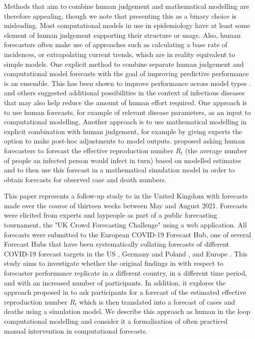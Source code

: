 \documentclass[10pt,a4paper,twocolumn]{article}
\begin{document}
Methods that aim to combine human judgement and mathematical modelling are therefore appealing, though we note that presenting this as a binary choice is misleading. Most computational models in use in epidemiology have at least some element of human judgement supporting their structure or usage. Also, human forecasters often make use of approaches such as calculating a base rate of incidences, or extrapolating current trends, which are in reality equivalent to simple models. One explicit method to combine separate human judgement and computational model forecasts with the goal of improving predictive performance is an ensemble. This has been shown to improve performance across model types \citep{mcandrewChimericForecastingCombining2022}. \citet{farrowHumanJudgmentApproach2017, bosseComparingHumanModelbased2022, swallowChallengesEstimationUncertainty2022} and others suggested additional possibilities in the context of infectious diseases that may also help reduce the amount of human effort required. One approach is to use human forecasts, for example of relevant disease parameters, as an input to computational modelling. Another approach is to use mathematical modelling in explicit combination with human judgement, for example by giving experts the option to make post-hoc adjustments to model outputs. \citet{bosseComparingHumanModelbased2022} proposed asking human forecasters to forecast the effective reproduction number $R_t$ (the average number of people an infected person would infect in turn) based on modelled estimates and to then use this forecast in a mathematical simulation model in order to obtain forecasts for observed case and death numbers. 

This paper represents a follow-up study to \citet{bosseComparingHumanModelbased2022} in the United Kingdom with forecasts made over the course of thirteen weeks between May and August 2021. Forecasts were elicited from experts and laypeople as part of a public forecasting tournament, the "UK Crowd Forecasting Challenge" using a web application. All forecasts were submitted to the European COVID-19 Forecast Hub, one of several Forecast Hubs that have been systematically collating forecasts of different COVID-19 forecast targets in the US \citep{cramerEvaluationIndividualEnsemble2021}, Germany and Poland \citep{bracherShorttermForecastingCOVID192021, bracherNationalSubnationalShortterm2022}, and Europe \citep{sherrattPredictivePerformanceMultimodel2022a}. This study aims to investigate whether the original findings in \citet{bosseComparingHumanModelbased2022} with respect to forecaster performance replicate in a different country, in a different time period, and with an increased number of participants. In addition, it explores the approach proposed in \citet{bosseComparingHumanModelbased2022} to ask participants for a forecast of the estimated effective reproduction number $R_t$ which is then translated into a forecast of cases and deaths using a simulation model. We describe this approach as human in the loop computational modelling and consider it a formalisation of often practiced manual intervention in computational forecasts.
\end{document}
